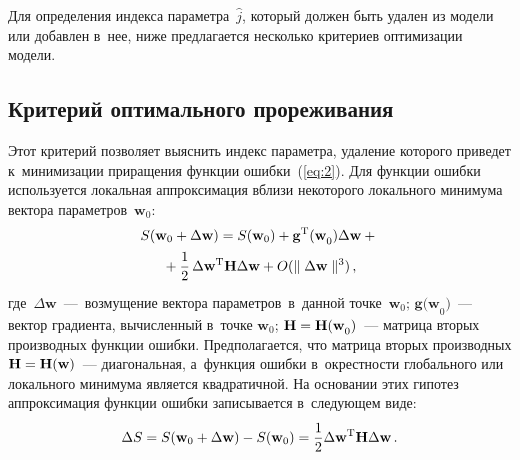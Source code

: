\begin{multicols}{2}
Для определения индекса параметра~$\hat{j}$, который должен быть
удален из модели или добавлен в~нее, ниже предлагается несколько
критериев оптимизации модели.

\subsection{Критерий оптимального прореживания}

Этот критерий позволяет выяснить индекс параметра, удаление которого
приведет к~минимизации приращения функции ошибки~(\ref{eq:2}).
Для функции ошибки используется локальная аппроксимация вблизи некоторого
локального минимума вектора параметров~$\mathbf{w}_0$:
\begin{multline*}
S(\mathbf{w}_0 + \Delta \mathbf{w}) = S(\mathbf{w}_0) +
\mathbf{g}^{\mathrm{T}}\mathbf{(w}_0)\Delta \mathbf{w} + {}\\
{}+\displaystyle\frac{\displaystyle 1\mathstrut}{\displaystyle 2\mathstrut}\,\Delta\mathbf{w}^{\mathrm{T}}
\mathbf{H}\Delta \mathbf{w} + O(\parallel\Delta \mathbf{w}\parallel^3)\,,
\end{multline*}
где~$\Delta \mathbf{w}$~---~возмущение вектора параметров~в~данной
точке~$\mathbf{w}_0;\,\mathbf{g(w}_0)$~--- вектор градиента, вычисленный
в~точке $\mathbf{w}_0$; $\mathbf{H} \hm= \mathbf{H(w}_0)$~--- матрица
вторых производных функции ошибки.
Предполагается, что мат\-ри\-ца вторых производных
$\mathbf{H}\hm=\mathbf{H}(\mathbf{w})$~--- диагональная, а~функция ошибки
в~окрестности глобального или локального минимума является квадратичной.
На основании этих гипотез аппроксимация функции ошибки записывается
в~следующем виде:
\begin{equation*}
\Delta S = S(\mathbf{w}_0 + \Delta \mathbf{w}) - S(\mathbf{w}_0) =
\displaystyle\frac{\displaystyle 1\mathstrut}{\displaystyle 2\mathstrut}\Delta \mathbf{w}^{\mathrm{T}}\mathbf{H}\Delta \mathbf{w}\,.
\end{equation*}


\end{multicols}
